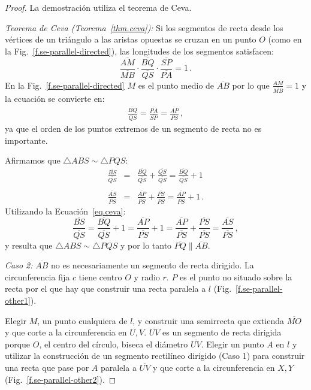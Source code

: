 \begin{proof}
La demostración utiliza el teorema de Ceva.

\textit{Teorema de Ceva  (Teorema~\ref{thm.ceva}):}
Si los segmentos de recta desde los vértices de un triángulo a las aristas opuestas se cruzan en un punto $O$ (como en la Fig.~\ref{f.se-parallel-directed}), las longitudes de los segmentos satisfacen:
\[
\frac{\overline{AM}}{\overline{MB}}\cdot\frac{\overline{BQ}}{\overline{QS}}\cdot\frac{\overline{SP}}{\overline{PA}} = 1\,.
\]
En la Fig.~\ref{f.se-parallel-directed} $M$ es el punto medio de $\overline{AB}$ por lo que $\displaystyle\frac{\overline{AM}}{\overline{MB}}=1$ y la ecuación se convierte en:
\begin{align}
\frac{\overline{BQ}}{\overline{QS}}=\frac{\overline{PA}}{\overline{SP}}=\frac{\overline{AP}}{\overline{PS}}\,,\label{eq.ceva}
\end{align}
ya que el orden de los puntos extremos de un segmento de recta no es importante.

Afirmamos que $\triangle ABS \sim \triangle PQS$:
\begin{eqnarray*}
\frac{\overline{BS}}{\overline{QS}}&=&\frac{\overline{BQ}}{\overline{QS}}+\frac{\overline{QS}}{\overline{QS}} = \frac{\overline{BQ}}{\overline{QS}}+1\\
&&\\
\frac{\overline{AS}}{\overline{PS}} &=& \frac{\overline{AP}}{\overline{PS}} + \frac{\overline{PS}}{\overline{PS}} = \frac{\overline{AP}}{\overline{PS}} + 1\,.
\end{eqnarray*}
Utilizando la Ecuación~\ref{eq.ceva}:
\[
\frac{\overline{BS}}{\overline{QS}}=\frac{\overline{BQ}}{\overline{QS}}+1=\frac{\overline{AP}}{\overline{PS}}+1=\frac{\overline{AP}}{\overline{PS}}+\frac{\overline{PS}}{\overline{PS}}=\frac{\overline{AS}}{\overline{PS}}\,,
\]
y resulta que $\triangle ABS \sim \triangle PQS$ y por lo tanto $\overline{PQ}\parallel\overline{AB}$.

\textit{Caso 2:}
$\overline{AB}$ no es necesariamente un segmento de recta dirigido. La circunferencia fija $c$ tiene centro $O$ y radio $r$. $P$ es el punto no situado sobre la recta por el que hay que construir una recta paralela a $l$ (Fig.~\ref{f.se-parallel-other1}).

Elegir $M$, un punto cualquiera de $l$, y construir una semirrecta que extienda $\overline{MO}$ y que corte a la circunferencia en $U,V$.
$\overline{UV}$ es un segmento de recta dirigida porque $O$, el centro del círculo, biseca el diámetro $\overline{UV}$. Elegir un punto $A$ en $l$ y utilizar la construcción de un segmento rectilíneo dirigido (Caso 1) para construir una recta que pase por $A$ paralela a $\overline{UV}$ y que corte a la circunferencia en $X,Y$ (Fig.~\ref{f.se-parallel-other2}).


\end{proof}
